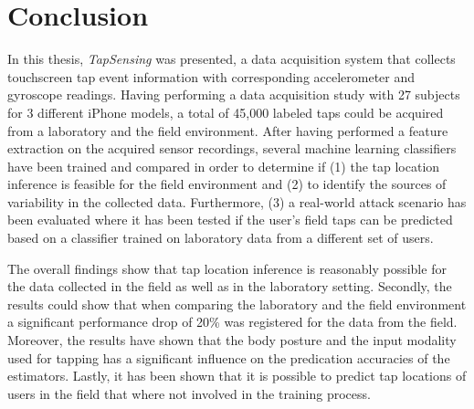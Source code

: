 \chapter{Conclusion\label{cha:chapter7}}

In this thesis, \textit{TapSensing} was presented, a data acquisition system that collects touchscreen tap event information with corresponding accelerometer and gyroscope readings. Having performing a data acquisition study with 27 subjects for 3 different iPhone models, a total of 45,000 labeled taps could be acquired from a laboratory and the field environment. After having performed a feature extraction on the acquired sensor recordings, several machine learning classifiers have been trained and compared in order to determine if (1) the tap location inference is feasible for the field environment and (2) to identify the sources of variability in the collected data. Furthermore, (3) a real-world attack scenario has been evaluated where it has been tested if the user's field taps can be predicted based on a classifier trained on laboratory data from a different set of users.

The overall findings show that tap location inference is reasonably possible for the data collected in the field as well as in the laboratory setting. Secondly, the results could show that when comparing the laboratory and the field environment a significant performance drop of 20\% was registered for the data from the field. Moreover, the results have shown that the body posture and the input modality used for tapping has a significant influence on the predication accuracies of the estimators. Lastly, it has been shown that it is possible to predict tap locations of users in the field that where not involved in the training process.



